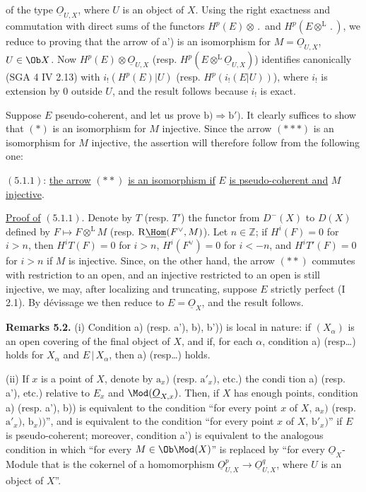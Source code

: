 %
of the type \(\underline{O}_{U,X}\), where \(U\) is an object of \(X\). Using the right exactness and commutation with direct sums of the functors \(H^p(E)\otimes\,.\,\) and \(H^p(E\otimes^{\mathrm L}\,.\,)\), we reduce to proving that the arrow of a') is an isomorphism for \(M=\underline{O}_{U,X}\), \(U\in\Ob X\). Now \(H^p(E)\otimes\underline{O}_{U,X}\) (resp. \(H^p(E\otimes^{\mathrm L}\underline{O}_{U,X})\)) identifies canonically (SGA 4 IV 2.13) with \(i_!(H^p(E)|U)\) (resp. \(H^p(i_!(E|U))\)), where \(i_!\) is extension by \(0\) outside \(U\), and the result follows because \(i_!\) is exact.

Suppose \(E\) pseudo-coherent, and let us prove \(\mathrm b)\Longrightarrow\mathrm b')\). It clearly suffices to show that \((*)\) is an isomorphism for \(M\) injective. Since the arrow \((***)\) is an isomorphism for \(M\) injective, the assertion will therefore follow from the following one:

\((5.1.1)\): \uline{the arrow} \((**)\) \uline{is an isomorphism if} \(E\) \uline{is pseudo-coherent and} \(M\) \uline{injective}.

\uline{Proof of} \((5.1.1)\). Denote by \(T\) (resp. \(T'\)) the functor from \(D^-(X)\) to \(D(X)\) defined by \(F\mapsto F\otimes^{\mathrm L}M\) (resp. \(\mathrm R\underline{\Hom}(F^{\vee},M)\)). Let \(n\in\mathbb Z\); if \(H^i(F)=0\) for \(i>n\), then \(H^iT(F)=0\) for \(i>n\), \(H^i(F^{\vee})=0\) for \(i<-n\), and \(H^iT'(F)=0\) for \(i>n\) if \(M\) is injective. Since, on the other hand, the arrow \((**)\) commutes with restriction to an open, and an injective restricted to an open is still injective, we may, after localizing and truncating, suppose \(E\) strictly perfect (I 2.1). By dévissage we then reduce to \(E=\underline{O}_X\), and the result follows.

\textbf{Remarks 5.2.} (i) Condition a) (resp. a'), b), b')) is local in nature: if \((X_\alpha)\) is an open covering of the final object of \(X\), and if, for each \(\alpha\), condition a) (resp\ldots) holds for \(X_\alpha\) and \(E\,|\,X_\alpha\), then a) (resp\ldots) holds.

(ii) If \(x\) is a point of \(X\), denote by \(\mathrm a_x)\) (resp. \(\mathrm a'_x)\), etc.) the condi%
%
tion a) (resp. a'), etc.) relative to \(E_x\) and \(\Mod(\underline{O}_{X,x})\). Then, if \(X\) has enough points, condition a) (resp. a'), b)) is equivalent to the condition ``for every point \(x\) of \(X\), \(\mathrm a_x)\) (resp. \(\mathrm a'_x)\), \(\mathrm b_x))\)'', and is equivalent to the condition ``for every point \(x\) of \(X\), \(\mathrm b'_x)\)'' if \(E\) is pseudo-coherent; moreover, condition a') is equivalent to the analogous condition in which ``for every \(M\in\Ob\Mod(X)\)'' is replaced by ``for every \(\underline{O}_X\)-Module that is the cokernel of a homomorphism \(\underline{O}_{U,X}^p\longrightarrow\underline{O}_{U,X}^q\), where \(U\) is an object of \(X\)''.

